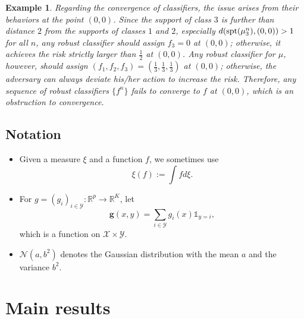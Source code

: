 \documentclass{amsart}
\theoremstyle{plain}
\numberwithin{equation}{section}\newtheorem{theorem}{Theorem}[section]
\newtheorem{example}[theorem]{Example}
\theoremstyle{remark}
\newcommand{\spt}{\textup{spt}}
\begin{document}
\begin{example}
Regarding the convergence of classifiers, the issue arises from their behaviors at the point $(0,0)$. Since the support of class $3$ is further than distance $2$ from the supports of classes $1$ and $2$, especially $d(\spt(\mu^n_3), (0,0)) > 1$ for all $n$, any robust classifier should assign $f_3=0$ at $(0,0)$; otherwise, it achieves the risk strictly larger than $\frac{1}{2}$ at $(0,0)$. Any robust classifier for $\mu$, however, should assign $(f_1, f_2, f_3)=(\frac{1}{3}, \frac{1}{3}, \frac{1}{3})$ at $(0,0)$; otherwise, the adversary can always deviate his/her action to increase the risk. Therefore, any sequence of robust classifiers $\{f^n\}$ fails to converge to $f$ at $(0,0)$, which is an obstruction to convergence.
\end{example}






\subsection{Notation}
\begin{itemize}
    \item Given a measure $\xi$ and a function $f$, we sometimes use
    \[
        \xi(f):= \int f d \xi.
    \]
    \item For $g=(g_i)_{i \in \mathcal{Y}} : \mathbb{R}^p \to \mathbb{R}^K$, let
\begin{equation}\label{eq: extension of g_i}
    \bm{g}(x,y) = \sum_{i \in \mathcal{Y}} g_i(x) \mathds{1}_{y=i},
\end{equation} 
which is a function on $\mathcal{X} \times \mathcal{Y}$.
    \item $\mathcal{N}(a, b^2)$ denotes the Gaussian distribution with the mean $a$ and the variance $b^2$.
\end{itemize}








\section{Main results}
\label{sec:main}
\end{document}
